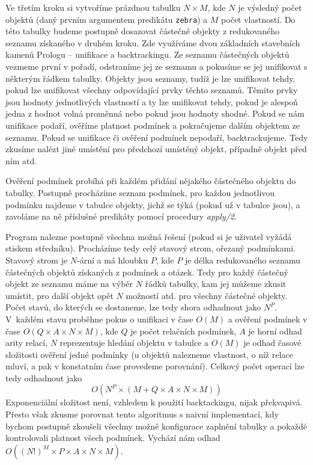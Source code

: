 \documentclass[11pt]{article} %
\begin{document}
Ve třetím kroku si vytvoříme prázdnou tabulku $N \times M$, kde $N$ je výsledný počet objektů (daný prvním argumentem predikátu \texttt{zebra}) a $M$ počet vlastností. Do této tabulky budeme postupně dosazovat částečné objekty z redukovaného seznamu získaného v druhém kroku. Zde využíváme dvou základních stavebních kamenů Prologu -- unifikace a backtrackingu. Ze seznamu částečných objektů vezmeme první v pořadí, odstraníme jej ze seznamu a pokusíme se jej unifikovat s některým řádkem tabulky. Objekty jsou seznamy, tudíž je lze unifikovat tehdy, pokud lze unifikovat všechny odpovídající prvky těchto seznamů. Těmito prvky jsou hodnoty jednotlivých vlastností a ty lze unifikovat tehdy, pokud je alespoň jedna z hodnot volná proměnná nebo pokud jsou hodnoty shodné. Pokud se nám unifikace podaří, ověříme platnost podmínek a pokračujeme dalším objektem ze seznamu. Pokud se unifikace či ověření podmínek nepodaří, backtrackujeme. Tedy zkusíme nalézt jiné umístění pro předchozí umístěný objekt, případně objekt před ním atd. 

Ověření podmínek probíhá při každém přidání nějakého částečného objektu do tabulky. Postupně procházíme seznam podmínek, pro každou jednotlivou podmínku najdeme v tabulce objekty, jichž se týká (pokud už v tabulce jsou), a zavoláme na ně příslušné predikáty pomocí procedury \emph{apply/2}.

Program nalezne postupně všechna možná řešení (pokud si je uživatel vyžádá stiskem středníku). Procházíme tedy celý stavový strom, ořezaný podmínkami. Stavový strom je $N$-ární a má hloubku $P$, kde $P$ je délka redukovaného seznamu částečných objektů získaných z podmínek a otázek. Tedy pro každý částečný objekt ze seznamu máme na výběr $N$ řádků tabulky, kam jej můžeme zkusit umístit, pro další objekt opět $N$ možností atd. pro všechny částečné objekty. Počet stavů, do kterých se dostaneme, lze tedy shora odhadnout jako $N^P$. V~každém stavu proběhne pokus o unifikaci v čase $O(M)$ a ověření podmínek v čase $O(Q \times A \times N \times M)$, kde $Q$ je počet relačních podmínek, $A$ je horní odhad arity relací, $N$ reprezentuje hledání objektu v tabulce a $O(M)$ je odhad časové složitosti ověření jedné podmínky (u objektů nalezneme vlastnost, o níž relace mluví, a pak v konstatním čase provedeme porovnání). Celkový počet operací lze tedy odhadnout jako $$O(N^P \times (M + Q \times A \times N \times M))$$
Exponenciální složitost není, vzhledem k použití backtackingu, nijak překvapivá. Přesto však zkusme porovnat tento algoritmus s naivní implementací, kdy bychom postupně zkoušeli všechny možné konfigurace zaplnění tabulky a pokaždé kontrolovali platnost všech podmínek. Vychází nám odhad $O((N!)^M \times P \times A \times N \times M)$. 
\end{document}
